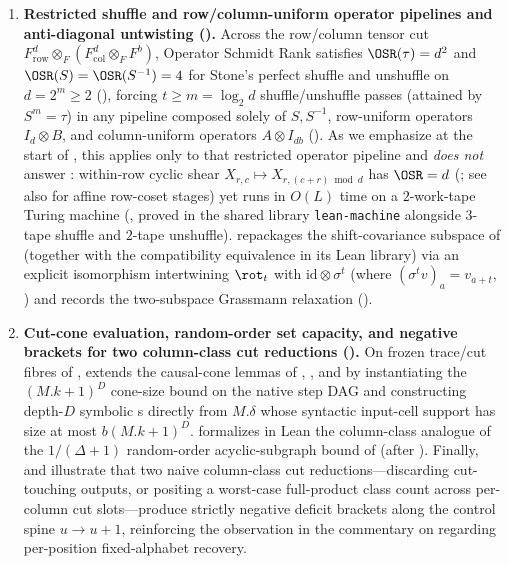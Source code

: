 \begin{enumerate}[label=\arabic*.]
\item \textbf{Restricted shuffle and row/column-uniform operator pipelines and anti-diagonal untwisting ().}
  Across the row/column tensor cut $F_{\mathrm{row}}^d \otimes_F (F_{\mathrm{col}}^d \otimes_F F^b)$,
  Operator Schmidt Rank satisfies $\OSR(\tau) = d^2$ and $\OSR(S) = \OSR(S^{-1}) = 4$ for Stone's
  perfect shuffle and unshuffle \cite{Stone1971,Nielsen2003,Tyson2003} on $d = 2^m \ge 2$
  (), forcing $t \ge m = \log_2 d$ shuffle/unshuffle passes (attained by
  $S^m = \tau$) in any pipeline composed solely of $S, S^{-1}$, row-uniform operators $I_d \otimes B$,
  and column-uniform operators $A \otimes I_{db}$ (). As we emphasize at the start
  of , this applies only to that restricted operator pipeline and \emph{does not}
  answer \cite[Problem~9.5]{SeventeenthPaper2026}: within-row cyclic shear
  $X_{r,c} \mapsto X_{r, (c+r)\bmod d}$ has $\OSR = d$ (; see also
  \cite[Proposition~6.25(a)]{SeventeenthPaper2026} for affine row-coset stages) yet runs in $O(L)$
  time on a $2$-work-tape Turing machine (, proved in the shared library
  \texttt{lean-machine} alongside $3$-tape shuffle and $2$-tape unshuffle). 
  repackages the shift-covariance subspace of \cite[Lemma~3.1]{SharedDecoders2026} (together with the
  compatibility equivalence  in its Lean library)
  via an
  explicit  isomorphism intertwining $\rot_t$ with $\mathrm{id} \otimes \sigma^t$
  (where $(\sigma^t v)_a = v_{a+t}$, ) and records the two-subspace Grassmann
  relaxation ().

\item \textbf{Cut-cone evaluation, random-order set capacity, and negative brackets for two column-class cut reductions ().}
  On frozen trace/cut fibres of ,  extends the causal-cone
  lemmas of \cite[Lemma~4.4 and Corollary~4.5]{FourthPaper2026},
  \cite[Lemmas~3.3(b) and~4.7(a)]{MergeDepth2026}, and
  \cite{AdaptiveTransfer2026} by instantiating the $(M.k+1)^D$ cone-size bound on the native step DAG
  and constructing depth-$D$ symbolic s directly from
  $M.\delta$ whose syntactic input-cell support has size at most $b(M.k+1)^D$.
   formalizes in Lean the column-class analogue of the
  $1/(\Delta+1)$ random-order acyclic-subgraph bound of
  \cite[Proposition~4.14(a)--(b)]{FourthPaper2026} (after \cite[Theorem~3]{BBJK2011}). Finally,
   and  illustrate that two naive column-class
  cut reductions---discarding cut-touching outputs, or positing a worst-case full-product class count
  across per-column cut slots---produce strictly negative deficit brackets along the control spine
  $u \to u+1$, reinforcing the observation in the commentary on
  \cite[Problem~9.4(b)]{SeventeenthPaper2026} regarding per-position fixed-alphabet recovery.
\end{enumerate}

